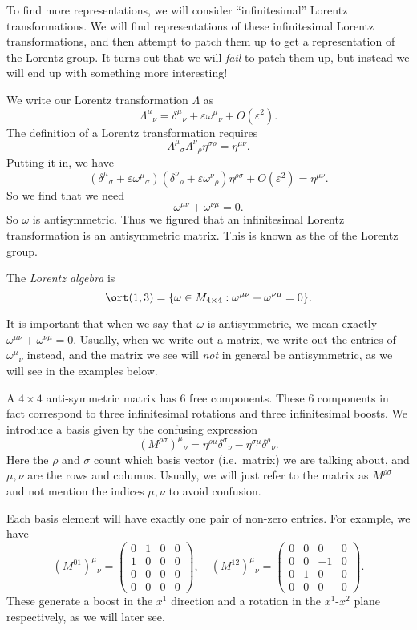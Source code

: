 \documentclass[a4paper]{article}
\begin{document}
To find more representations, we will consider ``infinitesimal'' Lorentz transformations. We will find representations of these infinitesimal Lorentz transformations, and then attempt to patch them up to get a representation of the Lorentz group. It turns out that we will \emph{fail} to patch them up, but instead we will end up with something more interesting!

We write our Lorentz transformation $\Lambda$ as
\[
  \Lambda^\mu\!_\nu = \delta^\mu\!_\nu + \varepsilon \omega^\mu\!_\nu + O(\varepsilon^2).
\]
The definition of a Lorentz transformation requires
\[
  \Lambda^\mu\!_\sigma \Lambda^\nu\!_\rho \eta^{\sigma \rho} = \eta^{\mu\nu}.
\]
Putting it in, we have
\[
  (\delta^\mu\!_\sigma + \varepsilon \omega^\mu\!_\sigma) (\delta^\nu\!_\rho + \varepsilon \omega^\nu\!_\rho) \eta^{\rho\sigma} + O(\varepsilon^2) = \eta^{\mu\nu}.
\]
So we find that we need
\[
  \omega^{\mu\nu} + \omega^{\nu\mu} = 0.
\]
So $\omega$ is antisymmetric. Thus we figured that an infinitesimal Lorentz transformation is an antisymmetric matrix. This is known as the  of the Lorentz group.
\begin{defi}
  The \emph{Lorentz algebra} is
  \[
    \ort(1, 3) = \{\omega \in M_{4 \times 4}: \omega^{\mu\nu} + \omega^{\nu\mu} = 0\}.
  \]
\end{defi}
It is important that when we say that $\omega$ is antisymmetric, we mean exactly $\omega^{\mu\nu} + \omega^{\nu\mu} = 0$. Usually, when we write out a matrix, we write out the entries of $\omega^\mu\!_\nu$ instead, and the matrix we see will \emph{not} in general be antisymmetric, as we will see in the examples below.

A $4 \times 4$ anti-symmetric matrix has $6$ free components. These $6$ components in fact correspond to three infinitesimal rotations and three infinitesimal boosts. We introduce a basis given by the confusing expression
\[
  (M^{\rho\sigma})^\mu\!_\nu = \eta^{\rho\mu}\delta^\sigma\!_\nu - \eta^{\sigma\mu}\delta^{\rho}\!_\nu.
\]
Here the $\rho$ and $\sigma$ count which basis vector (i.e.\ matrix) we are talking about, and $\mu, \nu$ are the rows and columns. Usually, we will just refer to the matrix as $M^{\rho\sigma}$ and not mention the indices $\mu, \nu$ to avoid confusion.

Each basis element will have exactly one pair of non-zero entries. For example, we have
\[
  (M^{01})^\mu\!_\nu =
  \begin{pmatrix}
   0 & 1 & 0 & 0\\
   1 & 0 & 0 & 0\\
   0 & 0 & 0 & 0\\
   0 & 0 & 0 & 0
  \end{pmatrix},\quad
  (M^{12})^\mu\!_\nu =
  \begin{pmatrix}
    0 & 0 & 0 & 0\\
    0 & 0 & -1 & 0\\
    0 & 1 & 0 & 0\\
    0 & 0 & 0 & 0
  \end{pmatrix}.
\]
These generate a boost in the $x^1$ direction and a rotation in the $x^1$-$x^2$ plane respectively, as we will later see.
\end{document}
